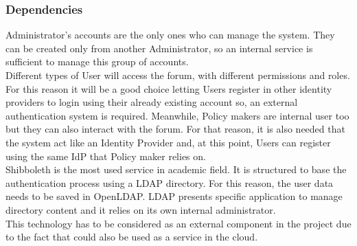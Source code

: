 \subsubsection{Dependencies}
Administrator's accounts are the only ones who can manage the system. They can be created only from another Administrator, so an internal service is sufficient to manage this group of accounts.\\
Different types of User will access the forum, with different permissions and roles. For this reason it will be a good choice letting Users register in other identity providers to login using their already existing account so, an external authentication system is required. Meanwhile, Policy makers are internal user too but they can also interact with the forum. For that reason, it is also needed that the system act like an Identity Provider and, at this point, Users can register using the same IdP that Policy maker relies on.\\
Shibboleth is the most used service in academic field. It is structured to base the authentication process using a LDAP directory. For this reason, the user data needs to be saved in OpenLDAP. LDAP presents specific application to manage directory content and it relies on its own internal administrator.\\
This technology has to be considered as an external component in the project due to the fact that could also be used as a service in the cloud. 
